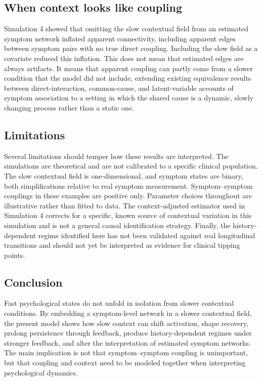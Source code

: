 \documentclass[man,12pt,floatsintext]{apa7}
\begin{document}
\subsection{When context looks like coupling}
Simulation 4 showed that omitting the slow contextual field from an estimated
symptom network inflated apparent connectivity, including apparent edges
between symptom pairs with no true direct coupling. Including the slow field as
a covariate reduced this inflation. This does not mean that estimated edges are
always artifacts. It means that apparent coupling can partly come from a slower
condition that the model did not include, extending existing equivalence
results between direct-interaction, common-cause, and latent-variable
accounts of symptom association \parencite{kruis2016three, marsman2018introduction, van2021latent} to a setting in which the shared cause is a
dynamic, slowly changing process rather than a static one.

\subsection{Limitations}
Several limitations should temper how these results are interpreted. The
simulations are theoretical and are not calibrated to a specific clinical
population. The slow contextual field is one-dimensional, and symptom states
are binary, both simplifications relative to real symptom measurement.
Symptom--symptom couplings in these examples are positive only. Parameter
choices throughout are illustrative rather than fitted to data. The
context-adjusted estimator used in Simulation 4 corrects for a specific, known
source of contextual variation in this simulation and is not a general causal
identification strategy. Finally, the history-dependent regime identified here
has not been validated against real longitudinal transitions and should not yet
be interpreted as evidence for clinical tipping points.

\subsection{Conclusion}
Fast psychological states do not unfold in isolation from slower contextual
conditions. By embedding a symptom-level network in a slower contextual field,
the present model shows how slow context can shift activation, shape recovery,
prolong persistence through feedback, produce history-dependent regimes under
stronger feedback, and alter the interpretation of estimated symptom networks.
The main implication is not that symptom--symptom coupling is unimportant, but
that coupling and context need to be modeled together when interpreting
psychological dynamics.
\end{document}
